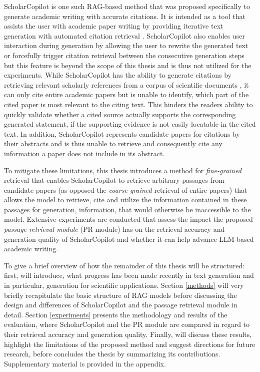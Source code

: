 ScholarCopilot \cite{wang2025scholarcopilot} is one such RAG-based method that was proposed specifically to generate academic writing with accurate citations. It is intended as a tool that assists the user with academic paper writing by providing iterative text generation with automated citation retrieval \cite{wang2025scholarcopilot}. ScholarCopilot also enables user interaction during generation \cite{wang2025scholarcopilot} by allowing the user to rewrite the generated text or forcefully trigger citation retrieval between the consecutive generation steps but this feature is beyond the scope of this thesis and is thus not utilized for the experiments. While ScholarCopilot has the ability to generate citations by retrieving relevant scholarly references from a corpus of scientific documents \cite{wang2025scholarcopilot}, it can only cite entire academic papers but is unable to identify, which part of the cited paper is most relevant to the citing text. This hinders the readers ability to quickly validate whether a cited source actually supports the corresponding generated statement, if the supporting evidence is not easily locatable in the cited text. In addition, ScholarCopilot represents candidate papers for citations by their abstracts and is thus unable to retrieve and consequently cite any information a paper does not include in its abstract.

To mitigate these limitations, this thesis introduces a method for \emph{fine-grained} retrieval that enables ScholarCopilot to retrieve arbitrary passages from candidate papers (as opposed the \emph{coarse-grained} retrieval of entire papers) that allows the model to retrieve, cite and utilize the information contained in these passages for generation, information, that would otherwise be inaccessible to the model. Extensive experiments are conducted that assess the impact the proposed \emph{passage retrieval module} (PR module) has on the retrieval accuracy and generation quality of ScholarCopilot and whether it can help advance LLM-based academic writing. 

To give a brief overview of how the remainder of this thesis will be structured: first,  will introduce, what progress has been made recently in text generation and in particular, generation for scientific applications. Section \ref{methods} will very briefly recapitulate the basic structure of RAG models before discussing the design and differences of ScholarCopilot and the passage retrieval module in detail. Section \ref{experiments} presents the methodology and results of the evaluation, where ScholarCopilot and the PR module are compared in regard to their retrieval accuracy and generation quality. Finally,  will discuss these results, highlight the limitations of the proposed method and suggest directions for future research, before  concludes the thesis by summarizing its contributions. Supplementary material is provided in the appendix. 

